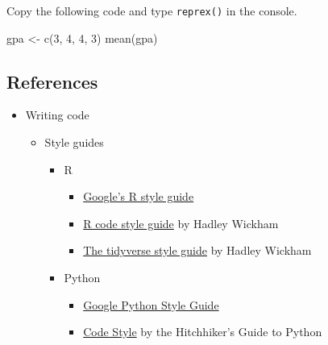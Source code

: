 \documentclass[
]{book}
\newenvironment{Shaded}{\begin{snugshade}}{\end{snugshade}}
\newcommand{\DecValTok}[1]{\textcolor[rgb]{0.00,0.00,0.81}{#1}}
\newcommand{\FunctionTok}[1]{\textcolor[rgb]{0.00,0.00,0.00}{#1}}
\newcommand{\NormalTok}[1]{#1}
\newcommand{\OtherTok}[1]{\textcolor[rgb]{0.56,0.35,0.01}{#1}}
\providecommand{\tightlist}{%
  \setlength{\itemsep}{0pt}\setlength{\parskip}{0pt}}
\begin{document}
Copy the following code and type \texttt{reprex()} in the console.

\begin{Shaded}
\begin{Highlighting}[]
\NormalTok{gpa }\OtherTok{\textless{}{-}} \FunctionTok{c}\NormalTok{(}\DecValTok{3}\NormalTok{, }\DecValTok{4}\NormalTok{, }\DecValTok{4}\NormalTok{, }\DecValTok{3}\NormalTok{)}
\FunctionTok{mean}\NormalTok{(gpa)}
\end{Highlighting}
\end{Shaded}

\hypertarget{references-2}{%
\subsection{References}\label{references-2}}

\begin{itemize}
\item
  Writing code

  \begin{itemize}
  \tightlist
  \item
    Style guides

    \begin{itemize}
    \tightlist
    \item
      R

      \begin{itemize}
      \tightlist
      \item
        \href{https://google.GitHub.io/styleguide/Rguide.xml}{Google's R style guide}
      \item
        \href{http://r-pkgs.had.co.nz/r.html}{R code style guide} by Hadley Wickham
      \item
        \href{http://style.tidyverse.org/}{The tidyverse style guide} by Hadley Wickham
      \end{itemize}
    \item
      Python

      \begin{itemize}
      \tightlist
      \item
        \href{https://GitHub.com/google/styleguide/blob/gh-pages/pyguide.md}{Google Python Style Guide}
      \item
        \href{https://docs.python-guide.org/writing/style/\#zen-of-python}{Code Style} by the Hitchhiker's Guide to Python
      \end{itemize}
    \end{itemize}
  \end{itemize}
\end{itemize}
\end{document}
